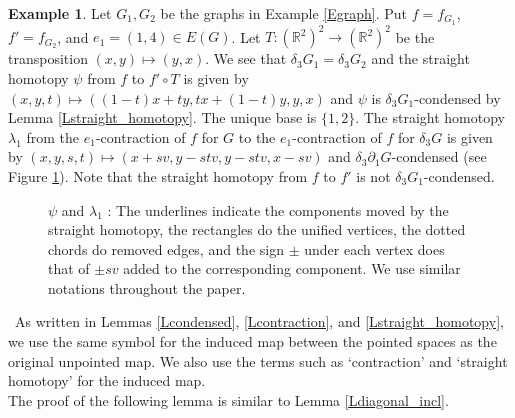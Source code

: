 \documentclass[reqno]{amsart}
\theoremstyle{definition}
\newtheorem{exa}[defi]{Example}
\theoremstyle{plain}
\newcommand{\RR}{\mathbb{R}}
\begin{document}
\begin{exa}\label{Estraight}
Let $G_1, G_2$ be the graphs in Example \ref{Egraph}. Put $f=f_{G_1}$, $f'=f_{G_2}$, and $e_1=(1,4)\in E(G)$. Let $T:(\RR^2)^2\to (\RR^2)^2$ be the transposition $(x,y)\mapsto (y,x)$. We see that $\delta_3G_1=\delta_3G_2$ and the straight homotopy $\psi$ from $f$ to $f'\circ T$ is given by $(x,y,t)\mapsto ((1-t)x+ty,tx+(1-t)y,y,x)$ and $\psi$ is  $\delta_3G_1$-condensed by Lemma \ref{Lstraight_homotopy}. The unique base  is $\{1,2\}$. The straight homotopy $\lambda_1$ from the $e_1$-contraction of $f$ for $G$ to the $e_1$-contraction of $f$ for $\delta_3G$ is given by $(x,y,s,t)\mapsto (x+sv,y-stv, y-stv,x-sv)$ and $\delta_3\partial_1G$-condensed (see Figure \ref{Fpsi}). Note that the straight homotopy from $f$ to $f'$ is not $\delta_3G_1$-condensed.
\end{exa}
\begin{figure}
\begin{center}

\end{center}
\caption{$\psi$ and $\lambda_1$ %
: The underlines indicate the components moved by the straight homotopy,  the rectangles do the unified vertices, the dotted chords do removed edges, and the sign $\pm$ under each vertex does that of $\pm sv$ added to the corresponding component. We use similar notations throughout the paper.}\label{Fpsi}
\end{figure}
\ As written in Lemmas  \ref{Lcondensed}, \ref{Lcontraction}, and \ref{Lstraight_homotopy}, we use the same symbol for the induced map between the pointed spaces as the original unpointed map. We also use the terms such as  `contraction' and `straight homotopy' for the induced map.\\



The proof of the following lemma is similar to Lemma \ref{Ldiagonal_incl}.
\end{document}
